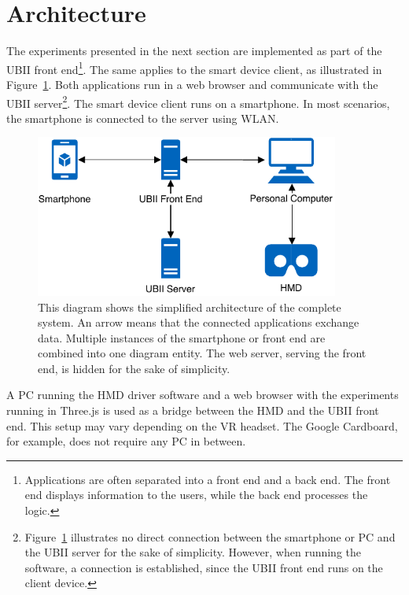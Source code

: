 \section{Architecture}\label{section:architecture}

The experiments presented in the next section are implemented as part of the \gls{UBII} front end\footnote{Applications are often separated into a front end and a back end. The front end displays information to the users, while the back end processes the logic.}. The same applies to the smart device client, as illustrated in Figure~\ref{fig:architecture}. Both applications run in a web browser and communicate with the \gls{UBII} server\footnote{Figure~\ref{fig:architecture} illustrates no direct connection between the smartphone or \gls{PC} and the \gls{UBII} server for the sake of simplicity. However, when running the software, a connection is established, since the \gls{UBII} front end runs on the client device.}. The smart device client runs on a smartphone. In most scenarios, the smartphone is connected to the server using \gls{WLAN}.

\begin{figure}[H]
  \centering
  \includegraphics[width=10cm]{figures/implementation/architecture.pdf}
  \caption[System architecture]{This diagram shows the simplified architecture of the complete system. An arrow means that the connected applications exchange data. Multiple instances of the smartphone or front end are combined into one diagram entity. The web server, serving the front end, is hidden for the sake of simplicity.}\label{fig:architecture}
\end{figure}

A \gls{PC} running the \gls{HMD} driver software and a web browser with the experiments running in Three.js is used as a bridge between the \gls{HMD} and the \gls{UBII} front end. This setup may vary depending on the \gls{VR} headset. The Google Cardboard, for example, does not require any \gls{PC} in between.

